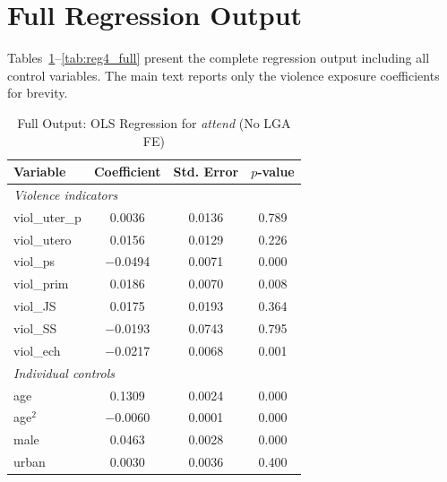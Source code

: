 
\section{Full Regression Output}
\label{app:full_results}

Tables~\ref{tab:reg1_full}--\ref{tab:reg4_full} present the complete
regression output including all control variables. The main text reports
only the violence exposure coefficients for brevity.

\begin{landscape}   %
\begin{table}[H]
    \centering
    \caption{Full Output: OLS Regression for \textit{attend} (No LGA FE)}
    \label{tab:reg1_full}
    \begin{threeparttable}
        \begin{tabular}{lccc}
            \toprule
            Variable & Coefficient & Std. Error & $p$-value \\
            \midrule
            \multicolumn{4}{l}{\textit{Violence indicators}} \\[0.3em]
            viol\_uter\_p   & 0.0036  & 0.0136 & 0.789 \\
            viol\_utero     & 0.0156  & 0.0129 & 0.226 \\
            viol\_ps        & $-$0.0494 & 0.0071 & 0.000 \\
            viol\_prim      & 0.0186  & 0.0070 & 0.008 \\
            viol\_JS        & 0.0175  & 0.0193 & 0.364 \\
            viol\_SS        & $-$0.0193 & 0.0743 & 0.795 \\
            viol\_ech       & $-$0.0217 & 0.0068 & 0.001 \\[0.5em]
            \multicolumn{4}{l}{\textit{Individual controls}} \\[0.3em]
            age             & 0.1309  & 0.0024 & 0.000 \\
            age$^2$         & $-$0.0060 & 0.0001 & 0.000 \\
            male            & 0.0463  & 0.0028 & 0.000 \\
            urban           & 0.0030  & 0.0036 & 0.400 \\

\end{tabular}
\end{threeparttable}
\end{table}
\end{landscape}
